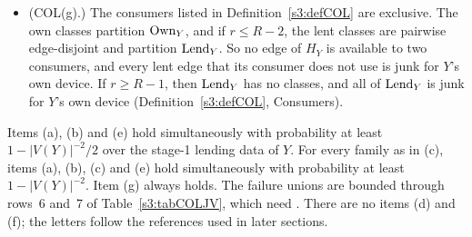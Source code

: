\begin{lemma}
\begin{itemize}
  $(2^{-6},s')$-expander with $s':=s_r/(16\kown)\ge2^{145}L_Y^{41}$ and
  $2\lceil L_Y^6\rceil\le s'$.
\item[(g)] (COL(g).) The consumers listed in Definition~\ref{s3:defCOL}
  are exclusive. The own classes partition $\mathrm{Own}_Y$, and if $r\le R-2$,
  the lent classes are pairwise edge-disjoint and partition $\mathrm{Lend}_Y$. So
  no edge of $H_Y$ is available to two consumers, and every lent edge
  that its consumer does not use is junk for $Y$'s own device. If
  $r\ge R-1$, then $\mathrm{Lend}_Y$ has no classes, and all of $\mathrm{Lend}_Y$ is junk
  for $Y$'s own device (Definition~\ref{s3:defCOL}, Consumers).
\end{itemize}
Items (a), (b) and (e) hold simultaneously with probability at least
$1-|V(Y)|^{-2}/2$ over the stage-1 lending data of $Y$. For every family
as in (c), items (a), (b), (c) and (e) hold simultaneously with
probability at least $1-|V(Y)|^{-2}$. Item (g) always holds. The failure
unions are bounded through rows~6 and~7 of Table~\ref{s3:tabCOLJV}, which
need . There are no items (d) and (f); the letters
follow the references used in later sections.
\deps{\ref{s3:defCOL}, \ref{s3:lemL15p}, \ref{s3:thmT16s}, \ref{s3:lemMonotone}, \ref{s3:lemCOLJV}, \ref{s2:lemTower}, \ref{s2:propStructure}, \ref{s2:defAncestors}, \ref{s1:condG1}}
\end{lemma}

